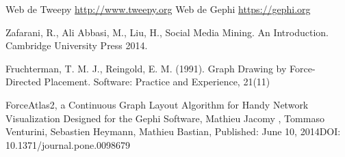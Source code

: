 % 

\begin{thebibliography}{99}

	\emph{} Web de Tweepy \url{http://www.tweepy.org}
	\emph{} Web de Gephi \url{https://gephi.org}

	\emph{} Zafarani, R., Ali Abbasi, M., Liu, H., Social Media Mining. An Introduction. Cambridge University Press 2014.	
	
	\emph{} Fruchterman, T. M. J.,  Reingold, E. M. (1991). Graph Drawing by Force-Directed Placement. Software: Practice and Experience, 21(11)

	\emph{} ForceAtlas2, a Continuous Graph Layout Algorithm for Handy Network Visualization Designed for the Gephi Software, Mathieu Jacomy , Tommaso Venturini, Sebastien Heymann, Mathieu Bastian, Published: June 10, 2014DOI: 10.1371/journal.pone.0098679
	
\end{thebibliography}
